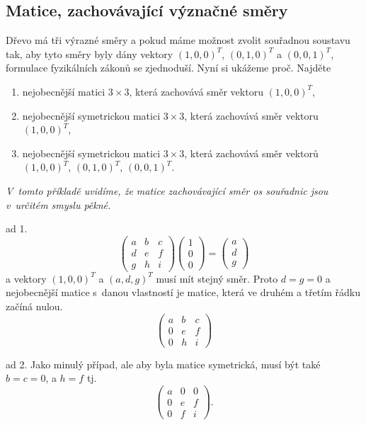 \konec

\stranka

\subsection{Matice, zachovávající význačné směry} Dřevo má tři výrazné
směry a pokud máme možnost zvolit souřadnou soustavu tak, aby tyto
směry byly dány vektory $(1,0,0)^T$, $(0,1,0)^T$ a $(0,0,1)^T$, formulace
fyzikálních zákonů se zjednoduší. Nyní si ukážeme proč. Najděte
\begin{enumerate}
\item  nejobecnější matici $3\times 3$, která zachovává směr vektoru $(1,0,0)^T$,
\item  nejobecnější symetrickou matici $3\times 3$, která zachovává směr vektoru $(1,0,0)^T$,
\item  nejobecnější symetrickou matici $3\times 3$, která zachovává směr vektorů $(1,0,0)^T$, $(0,1,0)^T$, $(0,0,1)^T$.
\end{enumerate}

\textit{V tomto příkladě uvidíme, že matice zachovávající směr os souřadnic jsou v určitém smyslu pěkné.}

\reseni
ad 1.
\begin{equation*}
  \begin{pmatrix}
    a & b & c \\ d & e & f \\ g& h& i \end{pmatrix}
  \begin{pmatrix}
    1\\0\\0
  \end{pmatrix}
  =
  \begin{pmatrix}
    a \\ d \\g
  \end{pmatrix}
\end{equation*}
a vektory $(1,0,0)^T$
a $(a,d,g)^T$ musí mít stejný směr. Proto $d=g=0$ a nejobecnější matice s danou vlastností je matice, která ve druhém a třetím řádku začíná nulou.
\begin{equation*}
    \begin{pmatrix}
    a & b & c \\ 0 & e & f \\ 0& h& i \end{pmatrix}
\end{equation*}

ad 2. Jako minulý případ, ale aby byla matice symetrická, musí být také $b=c=0$, a $h=f$ tj.
\begin{equation*}
    \begin{pmatrix}
    a & 0 & 0 \\ 0 & e & f \\ 0& f& i \end{pmatrix}.
\end{equation*}

